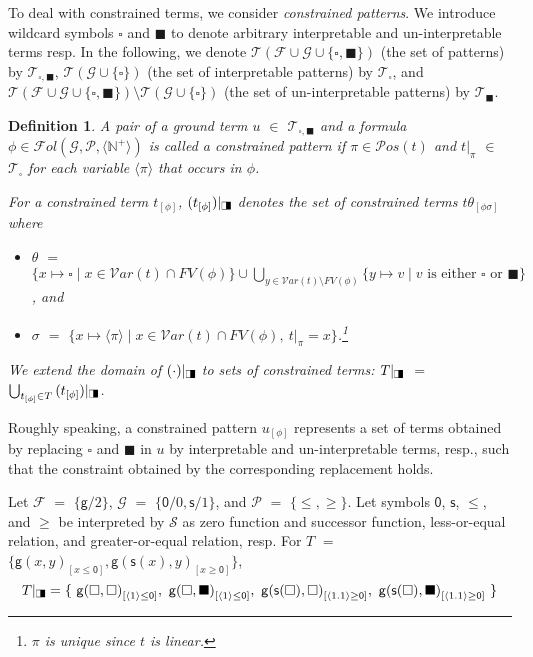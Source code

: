 \documentclass[copyright,creativecommons]{eptcs}
\newtheorem{definition}{Definition}
\newcommand{\cF}{\mathcal{F}}
\newcommand{\cG}{\mathcal{G}}
\newcommand{\cP}{\mathcal{P}}
\newcommand{\cS}{\mathcal{S}}
\newcommand{\Var}{{\mathcal{V}ar}}
\newcommand{\FVar}{{\mathit{FV}}}
\newcommand{\Pos}{{\mathcal{P}os}}
\newcommand{\posvar}[1]{{\langle}#1{\rangle}}
\newcommand{\Terms}{{\mathcal{T}}}
\newcommand{\TwC}[2]{{#1}_{[#2]}}
\newcommand{\Fol}{{\mathcal{F}\!\mathit{ol}}}
\newcommand{\Bothsquares}{\scalebox{.5}[.8]{$\square\!\blacksquare$}}
\newcommand{\Replace}[1]{{#1}|_{\Bothsquares}}
\begin{document}
To deal with constrained terms, we consider \emph{constrained
patterns}. 
We introduce wildcard symbols $\square$ and $\blacksquare$
to denote arbitrary interpretable and un-interpretable terms
resp.
In the following, we denote
$\Terms(\cF\cup\cG\cup\{\square,\blacksquare\})$ (the set of patterns)
by $\Terms_{\square,\blacksquare}$, 
$\Terms(\cG\cup\{\square\})$ (the set of interpretable patterns) by
$\Terms_\square$, and
$\Terms(\cF\cup\cG\cup\{\square,\blacksquare\})\setminus\Terms(\cG\cup\{\square\})$
(the set of un-interpretable patterns) by $\Terms_\blacksquare$. 
\begin{definition}
A pair of a ground term $u$ $\in$
 $\Terms_{\square,\blacksquare}$ and a formula $\phi \in
 \Fol(\cG,\cP,\posvar{\mathbb{N}^+})$ is called a \emph{constrained
 pattern} if $\pi \in \Pos(t)$ and $t|_\pi$ $\in$ $\Terms_\square$ for
 each variable $\posvar{\pi}$ that occurs in $\phi$. 

 For a constrained term $\TwC{t}{\phi}$, $\Replace{(\TwC{t}{\phi})}$
 denotes the set of constrained terms $\TwC{t\theta}{\phi\sigma}$ where
\begin{itemize}
\item $\theta$ $=$ $\{ x \mapsto \square \mid x \in \Var(t) \cap
       \FVar(\phi) \} \cup 
       \bigcup_{y \in \Var(t) \setminus \FVar(\phi)}
            \{ y \mapsto v \mid \text{$v$ is either $\square$ or $\blacksquare$} \}$, and
 \item $\sigma$ $=$ $\{ x \mapsto \posvar{\pi} \mid x \in
       \Var(t)\cap\FVar(\phi),~t|_\pi = x\}$.\footnote{ $\pi$ is unique since $t$ is linear. }
\end{itemize}
We extend the domain of $\Replace{(\cdot)}$ to sets of
 constrained terms:
$\Replace{T}$ $\!=\!$
 $\bigcup_{\TwC{t}{\phi}\in T}
 \Replace{(\TwC{t}{\phi})}$.
\end{definition}
Roughly speaking, a constrained pattern $\TwC{u}{\phi}$
 represents a set of terms obtained by replacing $\square$ and
 $\blacksquare$ in $u$ by interpretable and un-interpretable terms,
 resp., such that the constraint obtained by the corresponding
 replacement holds.
\begin{example}
 \label{ex:replace}
Let $\cF$ $=$ $\{ \mathsf{g}/2\}$, $\cG$ $=$ $\{
 \mathsf{0}/0,\mathsf{s}/1\}$, 
and $\cP$ $=$ $\{ \leq,\geq \}$.
Let symbols $\mathsf{0}$, $\mathsf{s}$, $\leq$, and $\geq$ be 
interpreted by $\cS$ as zero function and successor function, 
less-or-equal relation, and greater-or-equal relation, resp.
 For $T$ $=$ $\{ \TwC{\mathsf{g}(x,y)}{x \leq \mathsf{0}}, 
        \TwC{\mathsf{g}(\mathsf{s}(x),y)}{x \geq \mathsf{0}} \}$,
\[
 \Replace{T} =
 \{~
    \TwC{\mathsf{g}(\square,\square)}{\posvar{1}\leq \mathsf{0}}, 
    \ \TwC{\mathsf{g}(\square,\blacksquare)}{\posvar{1} \leq \mathsf{0}},
    \ \TwC{\mathsf{g}(\mathsf{s}(\square),\square)}
          {\posvar{1.1} \geq \mathsf{0}}, 
    \ \TwC{\mathsf{g}(\mathsf{s}(\square),\blacksquare)}
          {\posvar{1.1} \geq \mathsf{0}}
 ~\}
\]
\end{example}
\end{document}
